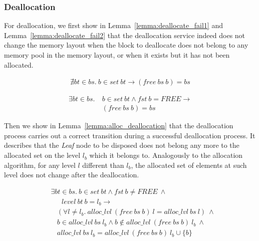 \subsubsection{Deallocation}\label{sec:functionalDealloc}
For deallocation, we first show in Lemma~\ref{lemma:deallocate_fail1} and Lemma~\ref{lemma:deallocate_fail2} that the deallocation service indeed does not change the memory layout when the block to deallocate does not belong to any memory pool in the memory layout, or when it exists but it has not been allocated.

\begin{lemma} 
\label{lemma:deallocate_fail1}
\begin{align*}
\nexists bt \in bs.\ b \in set\ bt \longrightarrow (free\ bs\ b) = bs
\end{align*}
\end{lemma}
	
\begin{lemma} 
\label{lemma:deallocate_fail2}
\begin{align*}
\exists bt \in bs.\ &b\in set\ bt \wedge fst\ b = FREE \longrightarrow \\ 
&(free\ bs\ b) = bs
\end{align*}
\end{lemma}

Then we show in Lemma~\ref{lemma:alloc_deallocation} that the deallocation process carries out a correct transition during a successful deallocation process. It describes that the \emph{Leaf} node to be disposed does not belong any more to the allocated set on the level $l_b$ which it belongs to. Analogously to the allocation algorithm, for any level $l$ different than $l_b$, the allocated set of elements at such level does not change after the deallocation.

\begin{lemma} 
\label{lemma:alloc_deallocation}
\end{lemma}
\vspace{-7pt}
\begin{align*}
&\exists bt \in bs.\ b \in set\ bt \wedge fst\ b \neq FREE\ \wedge\\
&\ \ \ \ \ \ \ level\ bt\ b = l_b \longrightarrow\\
&\ \ \ \ (\forall l \ne l_b.\ alloc\_lvl\ (free\ bs\ b)\ l = alloc\_lvl\ bs\ l)\ \wedge\\
&\ \ \ \ b \in alloc \_lvl\ bs\ l_b \wedge b \notin alloc\_lvl\ (free\ bs\ b)\ l_b\ \wedge\\
&\ \ \ \ alloc\_lvl\ bs\ l_b = alloc\_lvl\ (free\ bs\ b)\ l_b \cup \lbrace b \rbrace
\end{align*}
\vspace{-12pt}

